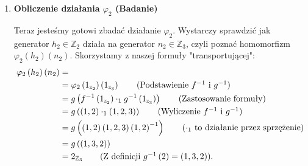 \begin{goall}
\begin{enumerate}[label=\textbf{Krok \arabic*.}, wide]
	Aby użyć formuły, musimy zdefiniować izomorfizmy. Używamy najbardziej naturalnego mapowania "generator na generator".
	\begin{itemize}
		\item $f: \langle \left( 1,2 \right)  \rangle \rightarrow \mathbb{Z}_2:$ Niech $f\left( \left( 1,2 \right)  \right) = 1_{\scriptscriptstyle\mathbb{Z}_2}$, wtedy $f^{-1}\left(1_{\scriptscriptstyle \mathbb{Z}_2} \right) = \left( 1,2 \right) $
		\item $g: \langle \left( 1,2,3 \right)  \rangle \rightarrow \mathbb{Z}_3:$ Niech $g\left( \left( 1,2,3 \right)  \right) = 1_{\scriptscriptstyle \mathbb{Z}_3}$,
			wtedy $g^{-1}\left( 1_{\mathbb{Z}_3} \right) = \left( 1,2,3 \right) $.

			Musimy też znać $g^{-1}\left( 2_{\scriptscriptstyle\mathbb{Z}_3} \right) $, czyli
			\[
			g^{-1}\left( 2_{\scriptscriptstyle\mathbb{Z}_3} \right) = g^{-1}\left( 1_{\scriptscriptstyle\mathbb{Z}_2} +_{\scriptscriptstyle\mathbb{Z}_2} 1_{\scriptscriptstyle\mathbb{Z}_2} \right) = g^{-1}\left( 1_{\scriptscriptstyle\mathbb{Z}_2} \right) \circ g^{-1}\left( 1_{\scriptscriptstyle\mathbb{Z}_2} \right) = \left( 1,2,3 \right) \circ \left( 1,2,3 \right) = \left( 1,3,2 \right)  
			.\] 
			\end{itemize}
	\item \textbf{Obliczenie działania $\varphi_2$ (Badanie)}

			Teraz jesteśmy gotowi zbadać działanie $\varphi_2$. Wystarczy sprawdzić jak generator $h_2\in \mathbb{Z}_2$ działa na generator $n_2\in \mathbb{Z}_3$, czyli poznać homomorfizm $\varphi_2\left( h_2 \right) \left( n_2 \right) $. Skorzystamy z naszej formuły "transportującej":
			\begin{align*}
				\varphi_2\left( h_2 \right) \left( n_2 \right) &= \\
									       &=\varphi_2\left( 1_{\scriptscriptstyle\mathbb{Z}_2} \right)\left( 1_{\scriptscriptstyle\mathbb{Z}_3} \right)\tag{Podstawienie $f^{-1}$ i $g^{-1}$}\\ &= g\left( f^{-1}\left( 1_{\scriptscriptstyle\mathbb{Z}_2} \right) \cdot_{1} g^{-1}\left( 1_{\scriptscriptstyle\mathbb{Z}_3} \right)  \right)\tag{Zastosowanie formuły}  \\ 									  &= g\left( \left( 1,2 \right) \cdot_{1} \left( 1,2,3 \right)  \right)\tag{Wyliczenie $f^{-1}$ i $g^{-1}$} \\
											  &= g\left( \left( 1,2 \right) \left( 1,2,3 \right) \left( 1,2 \right)^{-1} \right)\tag{$\cdot_{1}$ to działanie przez sprzężenie} \\
											  &= g\left( \left( 1,3,2 \right)  \right)  \\
											  &= 2_{\mathbb{Z}_3}\tag{Z definicji $g^{-1}\left( 2 \right) = \left( 1,3,2 \right) $} 
			.\end{align*}


\end{enumerate}
\end{goall}
